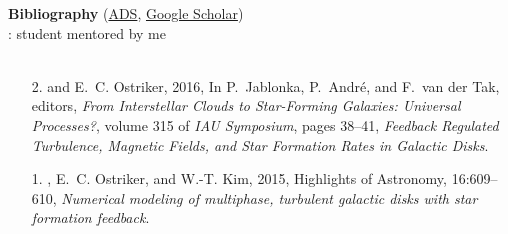 \documentclass[12pt,preprint,letterpaper]{aastex63}
\begin{document}


\clearpage
\begin{center}
    {\Large \bf Bibliography} 
    (\href{https://ui.adsabs.harvard.edu/search/q=\%3Dauthor\%3A\%22kim\%2Cchang-goo\%22}{ADS}, 
    \href{https://scholar.google.com/citations?user=jBOsJgoAAAAJ&hl=en}{Google Scholar})\\
    {: student mentored by me}\\
    \\
\end{center}

\begin{itemize}[itemsep=1pt]
    
\end{itemize}

\begin{itemize}[itemsep=1pt]
    
\end{itemize}

\begin{itemize}[itemsep=1pt]
\item[2.] \boldname{} and E.~C. {Ostriker}, 2016, In P.~{Jablonka},
  P.~{Andr{\'e}}, and F.~{van der Tak}, editors, {\em From Interstellar Clouds
  to Star-Forming Galaxies: Universal Processes?}, volume 315 of {\em IAU
  Symposium}, pages 38--41, \emph{{Feedback Regulated Turbulence, Magnetic
  Fields, and Star Formation Rates in Galactic Disks}}.
\item[1.] \boldname{}, E.~C. {Ostriker}, and W.-T. {Kim}, 2015,
  Highlights of Astronomy, 16:609--610, \emph{{Numerical modeling
  of multiphase, turbulent galactic disks with star formation feedback}}.
\end{itemize}
\end{document}
